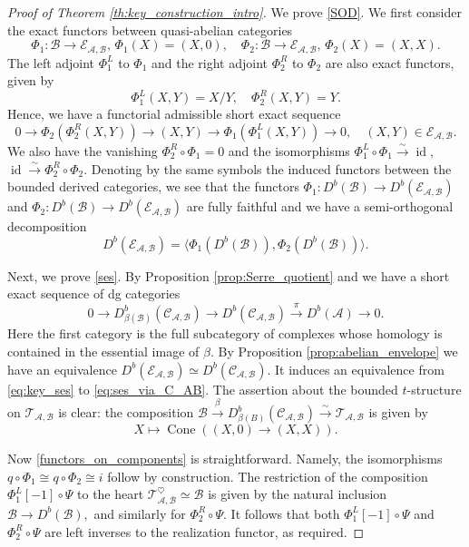 \documentclass[11pt,leqno]{amsart}
\numberwithin{equation}{section}
\newcommand{\xto}{\xrightarrow}
\newcommand{\Cone}{\operatorname{Cone}}
\newcommand{\cA}{{\mathcal A}}
\newcommand{\cB}{{\mathcal B}}
\newcommand{\cC}{{\mathcal C}}
\newcommand{\cE}{{\mathcal E}}
\newcommand{\cT}{{\mathcal T}}
\newcommand{\la}{\langle}
\newcommand{\ra}{\rangle}
\newcommand{\id}{\operatorname{id}}
\begin{document}
\begin{proof}[Proof of Theorem \ref{th:key_construction_intro}]
We prove \ref{SOD}. We first consider the exact functors between quasi-abelian categories
\begin{equation*}
\Phi_1:\cB\to\cE_{\cA,\cB},\,\Phi_1(X)=(X,0),\quad \Phi_2:\cB\to\cE_{\cA,\cB},\,\Phi_2(X)=(X,X).
\end{equation*} 
The left adjoint $\Phi_1^L$ to $\Phi_1$ and the right adjoint $\Phi_2^R$ to $\Phi_2$ are also exact functors, given by
\begin{equation*}
\Phi_1^L(X,Y)=X/Y,\quad \Phi_2^R(X,Y)=Y.
\end{equation*}
Hence, we have a functorial admissible short exact sequence
\begin{equation*}
0\to \Phi_2(\Phi_2^R(X,Y))\to (X,Y)\to \Phi_1(\Phi_1^L(X,Y))\to 0,\quad (X,Y)\in\cE_{\cA,\cB}.
\end{equation*}
We also have the vanishing $\Phi_2^R\circ \Phi_1=0$ and the isomorphisms $\Phi_1^L\circ\Phi_1\xto{\sim}\id,$ $\id\xto{\sim}\Phi_2^R\circ\Phi_2.$ Denoting by the same symbols the induced functors between the bounded derived categories, we see that the functors $\Phi_1:D^b(\cB)\to D^b(\cE_{\cA,\cB})$ and $\Phi_2:D^b(\cB)\to D^b(\cE_{\cA,\cB})$ are fully faithful and we have a semi-orthogonal decomposition
\begin{equation*}
D^b(\cE_{\cA,\cB})=\la \Phi_1(D^b(\cB)),\Phi_2(D^b(\cB))\ra.
\end{equation*}

Next, we prove \ref{ses}. By Proposition \ref{prop:Serre_quotient} and \cite[Lemma 1.15a]{Ke99} we have a short exact sequence of dg categories
\begin{equation}\label{eq:ses_via_C_AB}
0\to D^b_{\beta(\cB)}(\cC_{\cA,\cB})\to D^b(\cC_{\cA,\cB})\xto{\pi} D^b(\cA)\to 0. 
\end{equation}
Here the first category is the full subcategory of complexes whose homology is contained in the essential image of $\beta.$ By Proposition \ref{prop:abelian_envelope} we have an equivalence $D^b(\cE_{\cA,\cB})\simeq D^b(\cC_{\cA,\cB}).$ It induces an equivalence from \eqref{eq:key_ses} to \eqref{eq:ses_via_C_AB}. The assertion about the bounded $t$-structure on $\cT_{\cA,\cB}$ is clear: the composition $\cB\xto{\beta} D^b_{\beta(B)}(\cC_{\cA,\cB})\xto{\sim} \cT_{\cA,\cB}$ is given by
\begin{equation*}
X\mapsto \Cone((X,0)\to (X,X)).
\end{equation*}

Now \ref{functors_on_components} is straightforward. Namely, the isomorphisms $q\circ \Phi_1\cong q\circ \Phi_2\cong i$ follow by construction. The restriction of the composition $\Phi_1^L[-1]\circ\Psi$ to the heart $\cT_{\cA,\cB}^{\heartsuit}\simeq \cB$ is given by the natural inclusion $\cB\to D^b(\cB),$ and similarly for $\Phi_2^R\circ\Psi.$ It follows that both $\Phi_1^L[-1]\circ\Psi$ and $\Phi_2^R\circ\Psi$ are left inverses to the realization functor, as required. 
\end{proof}
\end{document}
